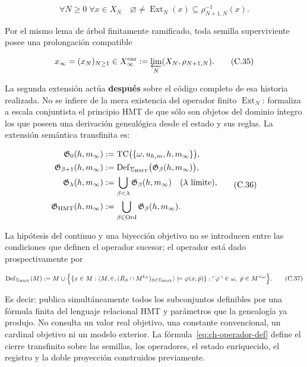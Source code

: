 \[
 \forall N\ge0\;\forall x\in X_N\quad
 \varnothing\ne\operatorname{Ext}_N(x)
 \subseteq\rho_{N+1,N}^{-1}(x).
\tag{C.34}\label{eq:ch-extension-no-vacia}
\]

Por el mismo lema de árbol finitamente ramificado, toda semilla superviviente
posee una prolongación compatible

\[
 x_\infty=(x_N)_{N\ge1}\in
 X_\infty^{\rm enr}:=\varprojlim_N(X_N,\rho_{N+1,N}).
\tag{C.35}\label{eq:ch-limite-inverso}
\]

La segunda extensión actúa \textbf{después} sobre el código completo de esa
historia realizada.
No se infiere de la mera existencia del operador finito
\(\operatorname{Ext}_N\): formaliza a escala conjuntista el principio HMT de
que sólo son objetos del dominio íntegro los que poseen una derivación
genealógica desde el estado y sus reglas. La extensión semántica transfinita
es:

\[
 \begin{aligned}
  \mathfrak G_0(h,m_\infty)
  &:=\operatorname{TC}\bigl(\{\omega,u_{h,m},h,m_\infty\}\bigr),\\
  \mathfrak G_{\beta+1}(h,m_\infty)
  &:=\operatorname{Def}_{\Sigma_{\rm HMT}}
       \bigl(\mathfrak G_\beta(h,m_\infty)\bigr),\\
  \mathfrak G_\lambda(h,m_\infty)
  &:=\bigcup_{\beta<\lambda}\mathfrak G_\beta(h,m_\infty)
       \quad(\lambda\text{ límite}),\\
  \mathfrak G_{\rm HMT}(h,m_\infty)
  &:=\bigcup_{\beta\in\operatorname{Ord}}
       \mathfrak G_\beta(h,m_\infty).
 \end{aligned}
\tag{C.36}\label{eq:ch-clausura-transfinita}
\]

La hipótesis del continuo y una biyección objetivo no se introducen entre las
condiciones que definen el operador sucesor; el operador está dado
prospectivamente por

\[
 \operatorname{Def}_{\Sigma_{\rm HMT}}(M)
 :=M\cup
 \Bigl\{
   \{x\in M:\langle M,\in,
       (\dot R_S\cap M^{k_S})_{S\in\Sigma_{\rm HMT}}\rangle
       \models\varphi(x,\bar p)\}:
   \ulcorner\varphi\urcorner\in\omega,
   \ \bar p\in M^{<\omega}
 \Bigr\}.
\tag{C.37}\label{eq:ch-operador-def}
\]

Es decir: publica simultáneamente todos los subconjuntos definibles por una
fórmula finita del lenguaje relacional HMT y parámetros que la genealogía ya
produjo. No
consulta un valor real objetivo, una constante convencional, un cardinal
objetivo ni un modelo exterior. La fórmula~\eqref{eq:ch-operador-def} define el cierre transfinito
sobre las semillas, los operadores, el estado enriquecido, el registro y la
doble proyección construidos previamente.

